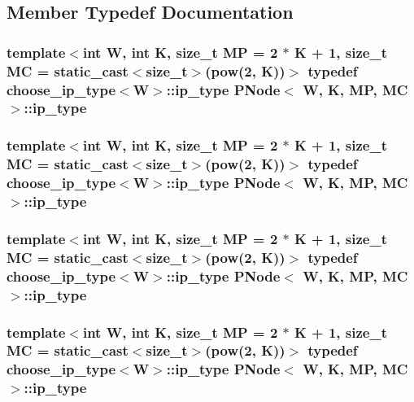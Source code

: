 \subsection{Member Typedef Documentation}
\hypertarget{structPNode_a61bb3b468d24d7a913120fffd4b4cb26}{
\subsubsection[{ip\-\_\-type}]{\setlength{\rightskip}{0pt plus 5cm}template$<$int W, int K, size\-\_\-t M\-P = 2 $\ast$ K + 1, size\-\_\-t M\-C = static\-\_\-cast$<$size\-\_\-t$>$(pow(2, K))$>$ typedef {\bf choose\-\_\-ip\-\_\-type}$<${\bf W}$>$\-::{\bf ip\-\_\-type} {\bf P\-Node}$<$ {\bf W}, K, M\-P, M\-C $>$\-::{\bf ip\-\_\-type}}}\label{structPNode_a61bb3b468d24d7a913120fffd4b4cb26}
\hypertarget{structPNode_a61bb3b468d24d7a913120fffd4b4cb26}{
\subsubsection[{ip\-\_\-type}]{\setlength{\rightskip}{0pt plus 5cm}template$<$int W, int K, size\-\_\-t M\-P = 2 $\ast$ K + 1, size\-\_\-t M\-C = static\-\_\-cast$<$size\-\_\-t$>$(pow(2, K))$>$ typedef {\bf choose\-\_\-ip\-\_\-type}$<${\bf W}$>$\-::{\bf ip\-\_\-type} {\bf P\-Node}$<$ {\bf W}, K, M\-P, M\-C $>$\-::{\bf ip\-\_\-type}}}\label{structPNode_a61bb3b468d24d7a913120fffd4b4cb26}
\hypertarget{structPNode_a61bb3b468d24d7a913120fffd4b4cb26}{
\subsubsection[{ip\-\_\-type}]{\setlength{\rightskip}{0pt plus 5cm}template$<$int W, int K, size\-\_\-t M\-P = 2 $\ast$ K + 1, size\-\_\-t M\-C = static\-\_\-cast$<$size\-\_\-t$>$(pow(2, K))$>$ typedef {\bf choose\-\_\-ip\-\_\-type}$<${\bf W}$>$\-::{\bf ip\-\_\-type} {\bf P\-Node}$<$ {\bf W}, K, M\-P, M\-C $>$\-::{\bf ip\-\_\-type}}}\label{structPNode_a61bb3b468d24d7a913120fffd4b4cb26}
\hypertarget{structPNode_a61bb3b468d24d7a913120fffd4b4cb26}{
\subsubsection[{ip\-\_\-type}]{\setlength{\rightskip}{0pt plus 5cm}template$<$int W, int K, size\-\_\-t M\-P = 2 $\ast$ K + 1, size\-\_\-t M\-C = static\-\_\-cast$<$size\-\_\-t$>$(pow(2, K))$>$ typedef {\bf choose\-\_\-ip\-\_\-type}$<${\bf W}$>$\-::{\bf ip\-\_\-type} {\bf P\-Node}$<$ {\bf W}, K, M\-P, M\-C $>$\-::{\bf ip\-\_\-type}}}\label{structPNode_a61bb3b468d24d7a913120fffd4b4cb26}
